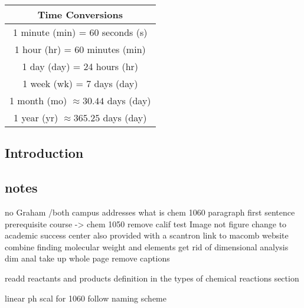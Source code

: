 \documentclass[10pt, roman]{article}
\begin{document}
\begin{minipage}{0.48\textwidth}
\vspace{10pt}

\begin{tabular}{|c|}
\hline
\textbf{Time Conversions} \\
\hline
1 minute (min) = 60 seconds (s) \\
1 hour (hr) = 60 minutes (min) \\
1 day (day) = 24 hours (hr) \\
1 week (wk) = 7 days (day) \\
1 month (mo) $\approx 30.44$ days (day) \\
1 year (yr) $\approx 365.25$ days (day) \\
\hline
\end{tabular}
\end{minipage}

\subsection{Introduction}
\newpage
\subsection{notes}




no Graham
/both campus addresses
what is chem 1060 paragraph first sentence
prerequisite course -> chem 1050
remove calif test
Image not figure
change to academic success center
also provided with a scantron
link to macomb website
combine finding molecular weight and elements
get rid of dimensional analysis
dim anal take up whole page remove captions

readd reactants and products definition in the types of chemical reactions section


linear ph scal for 1060 
follow naming scheme
\newpage
\end{document}
